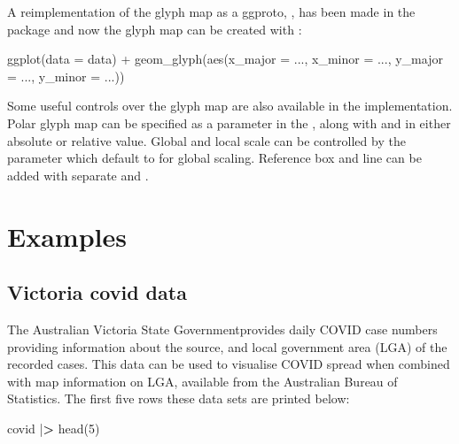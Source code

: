 \documentclass{article}
\newenvironment{Shaded}{\begin{snugshade}}{\end{snugshade}}
\newcommand{\AttributeTok}[1]{\textcolor[rgb]{0.77,0.63,0.00}{#1}}
\newcommand{\DecValTok}[1]{\textcolor[rgb]{0.00,0.00,0.81}{#1}}
\newcommand{\ErrorTok}[1]{\textcolor[rgb]{0.64,0.00,0.00}{\textbf{#1}}}
\newcommand{\FunctionTok}[1]{\textcolor[rgb]{0.00,0.00,0.00}{#1}}
\newcommand{\NormalTok}[1]{#1}
\newcommand{\SpecialCharTok}[1]{\textcolor[rgb]{0.00,0.00,0.00}{#1}}
\begin{document}
A reimplementation of the glyph map as a ggproto, , has been made in the  package and now the glyph map can be created with :

\begin{Shaded}
\begin{Highlighting}[]
\FunctionTok{ggplot}\NormalTok{(}\AttributeTok{data =}\NormalTok{ data) }\SpecialCharTok{+}
  \FunctionTok{geom\_glyph}\NormalTok{(}\FunctionTok{aes}\NormalTok{(}\AttributeTok{x\_major =}\NormalTok{ ..., }\AttributeTok{x\_minor =}\NormalTok{ ...,}
                 \AttributeTok{y\_major =}\NormalTok{ ..., }\AttributeTok{y\_minor =}\NormalTok{ ...))}
\end{Highlighting}
\end{Shaded}

Some useful controls over the glyph map are also available in the  implementation. Polar glyph map can be specified as a parameter  in the , along with  and  in either absolute or relative value. Global and local scale can be controlled by the parameter  which default to  for global scaling. Reference box and line can be added with separate  and .

\hypertarget{examples}{%
\section{Examples}\label{examples}}

\hypertarget{covid}{%
\subsection{Victoria covid data}\label{covid}}

The Australian Victoria State Governmentprovides daily COVID case numbers providing information about the source, and local government area (LGA) of the recorded cases. This data can be used to visualise COVID spread when combined with map information on LGA, available from the Australian Bureau of Statistics. The first five rows these data sets are printed below:

\begin{Shaded}
\begin{Highlighting}[]
\NormalTok{covid }\SpecialCharTok{|}\ErrorTok{\textgreater{}} \FunctionTok{head}\NormalTok{(}\DecValTok{5}\NormalTok{)}
\end{Highlighting}
\end{Shaded}
\end{document}
